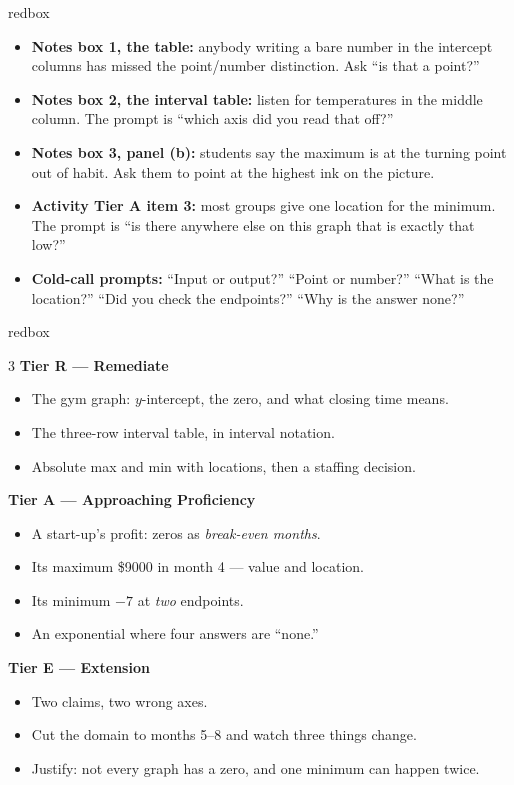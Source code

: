 \documentclass[10pt]{article}
\begin{document}
\begin{skillbox}{redbox}
\begin{itemize}[leftmargin=1.2em, itemsep=2pt, topsep=2pt]
  \item \textbf{Notes box 1, the table:} anybody writing a bare number in the intercept columns has
        missed the point/number distinction. Ask ``is that a point?''
  \item \textbf{Notes box 2, the interval table:} listen for temperatures in the middle column. The
        prompt is ``which axis did you read that off?''
  \item \textbf{Notes box 3, panel (b):} students say the maximum is at the turning point out of
        habit. Ask them to point at the highest ink on the picture.
  \item \textbf{Activity Tier A item 3:} most groups give one location for the minimum. The prompt is
        ``is there anywhere else on this graph that is exactly that low?''
  \item \textbf{Cold-call prompts:} ``Input or output?'' ``Point or number?'' ``What is the location?''
        ``Did you check the endpoints?'' ``Why is the answer none?''
\end{itemize}
\end{skillbox}

\boxguard
\begin{skillbox}{redbox}
\begin{multicols}{3}
\textbf{Tier R --- Remediate}
\begin{itemize}[leftmargin=1em, itemsep=1pt, topsep=2pt]
  \item The gym graph: $y$-intercept, the zero, and what closing time means.
  \item The three-row interval table, in interval notation.
  \item Absolute max and min with locations, then a staffing decision.
\end{itemize}

\columnbreak
\textbf{Tier A --- Approaching Proficiency}
\begin{itemize}[leftmargin=1em, itemsep=1pt, topsep=2pt]
  \item A start-up's profit: zeros as \emph{break-even months}.
  \item Its maximum \$9000 in month 4 --- value and location.
  \item Its minimum $-7$ at \emph{two} endpoints.
  \item An exponential where four answers are ``none.''
\end{itemize}

\columnbreak
\textbf{Tier E --- Extension}
\begin{itemize}[leftmargin=1em, itemsep=1pt, topsep=2pt]
  \item Two claims, two wrong axes.
  \item Cut the domain to months 5--8 and watch three things change.
  \item Justify: not every graph has a zero, and one minimum can happen twice.
\end{itemize}
\end{multicols}
\end{skillbox}
\end{document}
